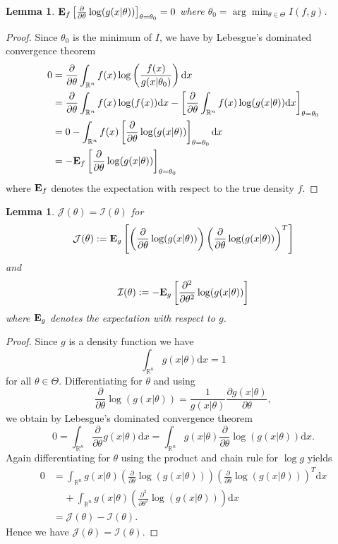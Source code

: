 \documentclass[a4paper, 11pt]{scrreprt}
\newtheorem{Lemma}[Theorem]{Lemma}
\newcommand{\RR}{\mathbb{R}}
\newcommand{\ew}{\mbox{\textbf{E}}}
\begin{document}
\begin{Lemma} \label{aic:lemma1} \upshape
$\ew_f \left[\frac{\partial}{\partial \theta} \log(g(x|\theta)) \right]_{\theta=\theta_0} = 0$ where $\theta_0 = \arg\min_{\theta \in \Theta} I(f,g)$.
\end{Lemma}
\begin{proof}
Since $\theta_0$ is the minimum of $I$, we have by Lebesgue's dominated convergence theorem
\begin{align*}
0 &=
\frac{\partial}{\partial \theta} \int_{\RR^n} f(x) \log\left( \frac{f(x)}{g(x|\theta_0)} \right)\mathrm{d}x \\
&= \frac{\partial}{\partial \theta} \int_{\RR^n} f(x) \log(f(x)) \mathrm{d}x
- \left[ \frac{\partial}{\partial \theta}  \int_{\RR^n} f(x) \log(g(x|\theta)) \mathrm{d}x \right]_{\theta = \theta_0} \\
&= 0 - \int_{\RR^n} f(x) \left[ \frac{\partial}{\partial \theta} \log (g(x|\theta)) \right]_{\theta = \theta_0} \mathrm{d}x \\
&= - \ew_f \left[\frac{\partial}{\partial \theta} \log(g(x|\theta)) \right]_{\theta=\theta_0}
\end{align*}
where $\ew_f$ denotes the expectation with respect to the true density $f$.
\end{proof}

\begin{Lemma}\label{aic:lemma2}\upshape $\mathcal{J}(\theta) = \mathcal{I}(\theta)$	
for  
\[ \mathcal{J}(\theta) :=  \ew_g\left[\left(\frac{\partial}{\partial \theta} \log(g(x|\theta)) \right) \left( \frac{\partial}{\partial \theta} \log(g(x|\theta)) \right)^T \right]
\]
and 
\[
\mathcal{I}(\theta) := - \ew_g\left[ \frac{\partial^2}{\partial \theta^2} \log(g(x|\theta)) \right]
\]
where $\ew_g$ denotes the expectation with respect to $g$.
\end{Lemma}
\begin{proof}
Since $g$ is a density function we have
\[ \int_{\RR^n} g(x|\theta) \mathrm{d}x =1 \] 
for all $\theta\in\Theta$.
Differentiating for $\theta$ and using 
\[ \frac{\partial}{\partial \theta} \log(g(x|\theta)) = \frac{1}{g(x|\theta)} \frac{\partial g(x|\theta) }{\partial \theta}, 
\]
we obtain by Lebesgue's dominated convergence theorem
\[
0 = \int_{\RR^n} \frac{\partial}{\partial \theta} g(x|\theta) \mathrm{d}x 
= \int_{\RR^n} g(x|\theta) \frac{\partial}{\partial \theta} \log(g(x|\theta)) \mathrm{d}x.
\]
Again differentiating for $\theta$ using the product and chain rule for $\log g$ yields
\begin{align*}
0 &= \int_{\RR^n} g(x|\theta) \left(\frac{\partial}{\partial \theta} \log(g(x|\theta)) \right) \left( \frac{\partial}{\partial \theta} \log(g(x|\theta)) \right)^T \mathrm{d}x \\
&\phantom{....} + \int_{\RR^n} g(x|\theta) \left( \frac{\partial^2}{\partial \theta^2} \log(g(x|\theta)) \right) \mathrm{d}x \\
&= \mathcal{J}(\theta) - \mathcal{I}(\theta).
\end{align*}
Hence we have $\mathcal{J}(\theta) = \mathcal{I}(\theta)$.
\end{proof}
\end{document}
